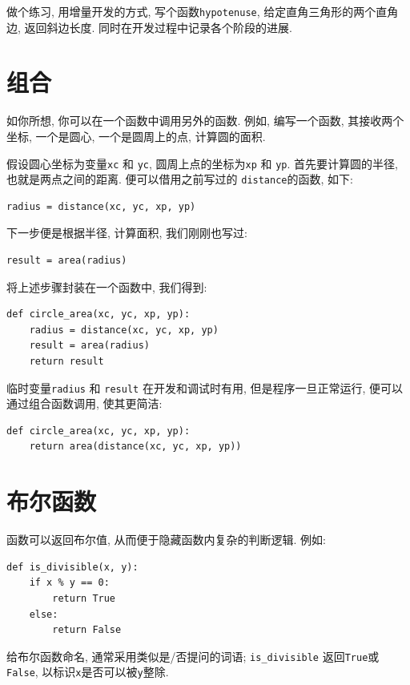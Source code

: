 \documentclass[10pt]{book}
\begin{document}
做个练习, 用增量开发的方式, 写个函数{\tt hypotenuse}, 
给定直角三角形的两个直角边, 返回斜边长度. 
同时在开发过程中记录各个阶段的进展. 


\section{组合}

如你所想, 你可以在一个函数中调用另外的函数. 
例如, 编写一个函数, 其接收两个坐标, 一个是圆心, 一个是圆周上的点, 
计算圆的面积. 

假设圆心坐标为变量{\tt xc} 和
{\tt yc}, 圆周上点的坐标为{\tt xp} 和 {\tt yp}.
首先要计算圆的半径, 也就是两点之间的距离. 
便可以借用之前写过的 {\tt distance}的函数, 如下:

\begin{verbatim}
radius = distance(xc, yc, xp, yp)
\end{verbatim}
%
下一步便是根据半径, 计算面积, 我们刚刚也写过:

\begin{verbatim}
result = area(radius)
\end{verbatim}
%
将上述步骤封装在一个函数中, 我们得到:

\begin{verbatim}
def circle_area(xc, yc, xp, yp):
    radius = distance(xc, yc, xp, yp)
    result = area(radius)
    return result
\end{verbatim}
%
临时变量{\tt radius} 和 {\tt result} 在开发和调试时有用, 但是程序一旦正常运行, 
便可以通过组合函数调用, 使其更简洁:

\begin{verbatim}
def circle_area(xc, yc, xp, yp):
    return area(distance(xc, yc, xp, yp))
\end{verbatim}
%

\section{布尔函数}
\label{boolean}

函数可以返回布尔值, 从而便于隐藏函数内复杂的判断逻辑.  
例如:

\begin{verbatim}
def is_divisible(x, y):
    if x % y == 0:
        return True
    else:
        return False
\end{verbatim}
%
给布尔函数命名, 通常采用类似是/否提问的词语; 
\verb"is_divisible" 返回{\tt True}或{\tt False}, 
以标识{\tt x}是否可以被{\tt y}整除. 
\end{document}
